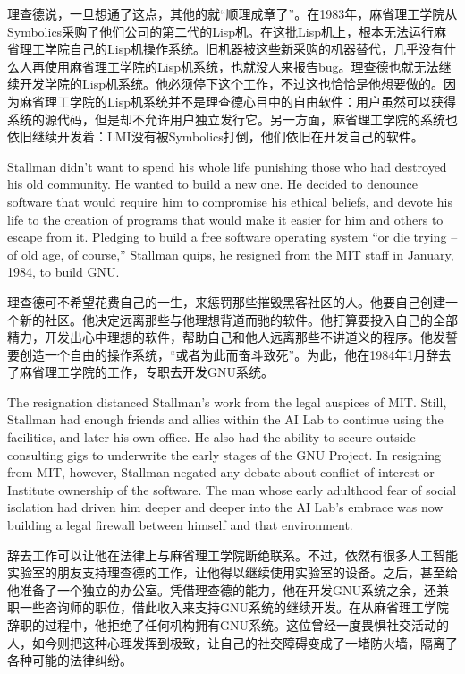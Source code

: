 \ifdefined\chs
理查德说，一旦想通了这点，其他的就``顺理成章了''。在1983年，麻省理工学院从Symbolics采购了他们公司的第二代的Lisp机。在这批Lisp机上，根本无法运行麻省理工学院自己的Lisp机操作系统。旧机器被这些新采购的机器替代，几乎没有什么人再使用麻省理工学院的Lisp机系统，也就没人来报告bug。理查德也就无法继续开发学院的Lisp机系统。他必须停下这个工作，不过这也恰恰是他想要做的。因为麻省理工学院的Lisp机系统并不是理查德心目中的自由软件：用户虽然可以获得系统的源代码，但是却不允许用户独立发行它。另一方面，麻省理工学院的系统也依旧继续开发着：LMI没有被Symbolics打倒，他们依旧在开发自己的软件。
\fi

\ifdefined\eng
Stallman didn't want to spend his whole life punishing those who had destroyed his old community.  He wanted to build a new one. He decided to denounce software that would require him to compromise his ethical beliefs, and devote his life to the creation of programs that would make it easier for him and others to escape from it. Pledging to build a free software operating system ``or die trying -- of old age, of course,'' Stallman quips, he resigned from the MIT staff in January, 1984, to build GNU.
\fi

\ifdefined\chs
理查德可不希望花费自己的一生，来惩罚那些摧毁黑客社区的人。他要自己创建一个新的社区。他决定远离那些与他理想背道而驰的软件。他打算要投入自己的全部精力，开发出心中理想的软件，帮助自己和他人远离那些不讲道义的程序。他发誓要创造一个自由的操作系统，``或者为此而奋斗致死''。为此，他在1984年1月辞去了麻省理工学院的工作，专职去开发GNU系统。
\fi

\ifdefined\eng
The resignation distanced Stallman's work from the legal auspices of MIT. Still, Stallman had enough friends and allies within the AI Lab to continue using the facilities, and later his own office. He also had the ability to secure outside consulting gigs to underwrite the early stages of the GNU Project. In resigning from MIT, however, Stallman negated any debate about conflict of interest or Institute ownership of the software. The man whose early adulthood fear of social isolation had driven him deeper and deeper into the AI Lab's embrace was now building a legal firewall between himself and that environment.
\fi

\ifdefined\chs
辞去工作可以让他在法律上与麻省理工学院断绝联系。不过，依然有很多人工智能实验室的朋友支持理查德的工作，让他得以继续使用实验室的设备。之后，甚至给他准备了一个独立的办公室。凭借理查德的能力，他在开发GNU系统之余，还兼职一些咨询师的职位，借此收入来支持GNU系统的继续开发。在从麻省理工学院辞职的过程中，他拒绝了任何机构拥有GNU系统。这位曾经一度畏惧社交活动的人，如今则把这种心理发挥到极致，让自己的社交障碍变成了一堵防火墙，隔离了各种可能的法律纠纷。
\fi

